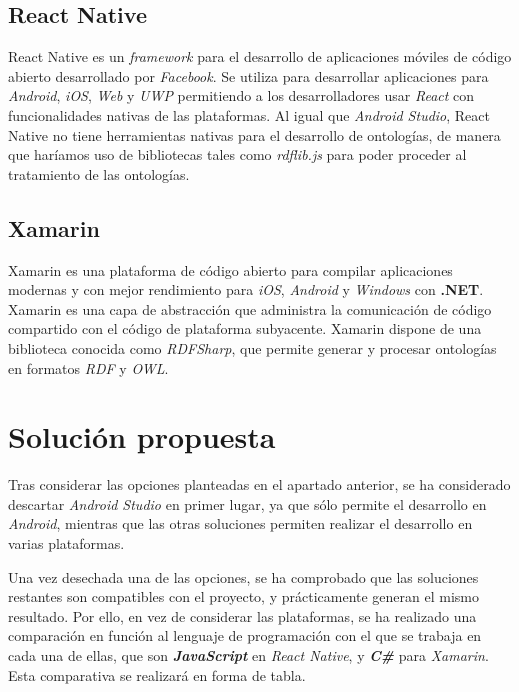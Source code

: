 \subsection{React Native}
React Native es un \textit{framework} para el desarrollo de aplicaciones móviles de código abierto desarrollado por 
\textit{Facebook}. Se utiliza para desarrollar aplicaciones para \textit{Android}, \textit{iOS}, \textit{Web} y 
\textit{UWP} permitiendo a los desarrolladores usar \textit{React} con funcionalidades nativas de las plataformas.
Al igual que \textit{Android Studio}, React Native no tiene herramientas nativas para el desarrollo de ontologías, de 
manera que haríamos uso de bibliotecas tales como \textit{rdflib.js} para poder proceder al tratamiento de las ontologías.

\subsection{Xamarin}
Xamarin es una plataforma de código abierto para compilar aplicaciones modernas y con mejor rendimiento para \textit{iOS}, 
\textit{Android} y \textit{Windows} con \textbf{.NET}. Xamarin es una capa de abstracción que administra la comunicación 
de código compartido con el código de plataforma subyacente. Xamarin dispone de una biblioteca conocida como 
\textit{RDFSharp}, que permite generar y procesar ontologías en formatos \textit{RDF} y \textit{OWL}.


\section{Solución propuesta}
Tras considerar las opciones planteadas en el apartado anterior, se ha considerado descartar \textit{Android Studio} en 
primer lugar, ya que sólo permite el desarrollo en \textit{Android}, mientras que las otras soluciones permiten realizar 
el desarrollo en varias plataformas. \medskip

Una vez desechada una de las opciones, se ha comprobado que las soluciones restantes son compatibles con el proyecto, y 
prácticamente generan el mismo resultado. Por ello, en vez de considerar las plataformas, se ha realizado una comparación 
en función al lenguaje de programación con el que se trabaja en cada una de ellas, que son \textit{\textbf{JavaScript}} en 
\textit{React Native}, y \textit{\textbf{C\#}} para \textit{Xamarin}. Esta comparativa se realizará en forma de tabla.\bigskip

